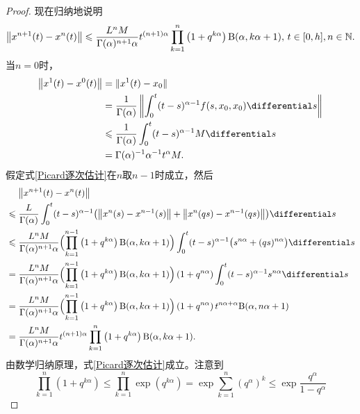\begin{proof}
    现在归纳地说明
    \begin{equation}\label{Picard逐次估计}
        \left\| x^{n+1}(t) - x^n(t) \right\|\leqslant \frac{L^n M}{\Gamma(\alpha)^{n+1} \alpha} t^{(n+1)\alpha} \prod_{k=1}^n \left(1+q^{k\alpha}\right) \mathrm{B}(\alpha, k\alpha+1),\,t\in [0,h],n\in\mathbb{N}.
    \end{equation}
    当$n=0$时，
    \begin{align*}
        \left\| x^1(t)-x^0(t) \right\|&=\| x^1(t)-x_0 \|\\
        &=\frac{1}{\Gamma(\alpha)}\left\| \int_0^t (t-s)^{\alpha-1} f(s,x_0,x_0)\differential s\right\|\\
        &\leqslant \frac{1}{\Gamma(\alpha)}\int_0^t (t-s)^{\alpha-1} M\differential s\\
        &=\Gamma(\alpha)^{-1} \alpha^{-1} t^\alpha M.
    \end{align*}
    假定式\eqref{Picard逐次估计}在$n$取$n-1$时成立，然后
    \begin{align*}
        &\mathrel{\phantom{\leqslant}} \left\| x^{n+1}(t)-x^n(t) \right\| \\ &\leqslant \frac{L}{\Gamma(\alpha)}\int_0^t (t-s)^{\alpha-1} \bigl(\left\|x^n(s)-x^{n-1}(s)\right\| + \left\|x^n(qs)-x^{n-1}(qs)\right\|\bigr) \differential s\\
        &\leqslant \frac{L^{n} M}{\Gamma(\alpha)^{n+1} \alpha} \Bigl(\prod_{k=1}^{n-1}\left(1+q^{k\alpha}\right) \Beta(\alpha, k\alpha+1)\Bigr)\int_0^t (t-s)^{\alpha-1} \bigl(s^{n\alpha} + (qs)^{n\alpha}\bigr) \differential s\\
        &=\frac{L^{n} M}{\Gamma(\alpha)^{n+1} \alpha} \Bigl(\prod_{k=1}^{n-1}\left(1+q^{k\alpha}\right) \Beta(\alpha, k\alpha+1)\Bigr) \left(1+q^{n\alpha}\right) \int_0^t (t-s)^{\alpha-1} s^{n\alpha} \differential s\\
        &=\frac{L^{n} M}{\Gamma(\alpha)^{n+1} \alpha} \Bigl(\prod_{k=1}^{n-1}\left(1+q^{k\alpha}\right) \Beta(\alpha, k\alpha+1)\Bigr) \left(1+q^{n\alpha}\right) t^{n\alpha+\alpha}\Beta(\alpha, n\alpha+1)\\
        &=\frac{L^n M}{\Gamma(\alpha)^{n+1} \alpha} t^{(n+1)\alpha} \prod_{k=1}^n \left(1+q^{k\alpha}\right) \Beta(\alpha, k\alpha+1).
    \end{align*}
    由数学归纳原理，式\eqref{Picard逐次估计}成立。注意到
    \begin{equation*}
        \prod_{k=1}^n \left(1+q^{k\alpha}\right)\leqslant \prod_{k=1}^n \exp\left(q^{k\alpha}\right)=\exp \sum_{k=1}^n \left(q^\alpha\right)^k\leqslant \exp \frac{q^\alpha}{1-q^\alpha}

\end{equation*}
\end{proof}
